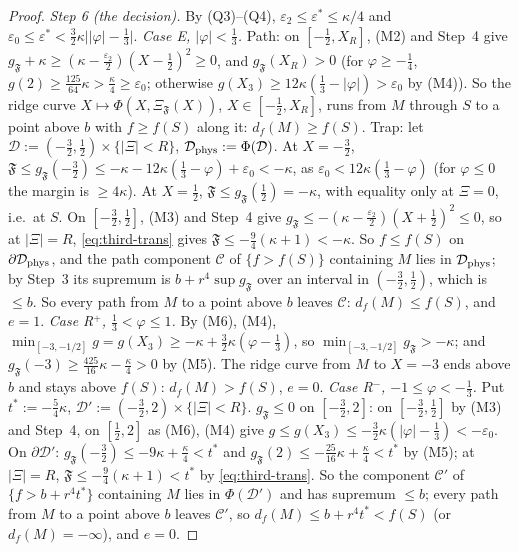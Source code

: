 \begin{proof}
\emph{Step 6 (the decision).} By (Q3)--(Q4), $\varepsilon_2\le\varepsilon^*\le\kappa/4$ and $\varepsilon_0\le\varepsilon^*<\frac32\kappa\bigl||\varphi|-\frac13\bigr|$.
\emph{Case E, $|\varphi|<\frac13$.} Path: on $[-\frac12,X_R]$, (M2) and Step~4 give $g_{\mathfrak F}+\kappa\ge(\kappa-\frac{\varepsilon_2}2)(X-\frac12)^2\ge0$, and $g_{\mathfrak F}(X_R)>0$ (for $\varphi\ge-\frac14$, $g(2)\ge\frac{125}{64}\kappa>\frac\kappa4\ge\varepsilon_0$; otherwise $g(X_3)\ge12\kappa(\frac13-|\varphi|)>\varepsilon_0$ by (M4)). So the ridge curve $X\mapsto\Phi(X,\Xi_{\mathfrak F}(X))$, $X\in[-\frac12,X_R]$, runs from $M$ through $S$ to a point above $b$ with $f\ge f(S)$ along it: $d_f(M)\ge f(S)$. Trap: let $\mathcal D:=(-\frac32,\frac12)\times\{|\Xi|<R\}$, $\mathcal D_{\rm phys}:=\Phi(\mathcal D)$. At $X=-\frac32$, $\mathfrak F\le g_{\mathfrak F}(-\frac32)\le-\kappa-12\kappa(\frac13-\varphi)+\varepsilon_0<-\kappa$, as $\varepsilon_0<12\kappa(\frac13-\varphi)$ (for $\varphi\le0$ the margin is $\ge4\kappa$). At $X=\frac12$, $\mathfrak F\le g_{\mathfrak F}(\frac12)=-\kappa$, with equality only at $\Xi=0$, i.e.\ at $S$. On $[-\frac32,\frac12]$, (M3) and Step~4 give $g_{\mathfrak F}\le-(\kappa-\frac{\varepsilon_2}2)(X+\frac12)^2\le0$, so at $|\Xi|=R$, \eqref{eq:third-trans} gives $\mathfrak F\le-\frac94(\kappa+1)<-\kappa$. So $f\le f(S)$ on $\partial\mathcal D_{\rm phys}$, and the path component $\mathcal C$ of $\{f>f(S)\}$ containing $M$ lies in $\mathcal D_{\rm phys}$; by Step~3 its supremum is $b+r^4\sup g_{\mathfrak F}$ over an interval in $(-\frac32,\frac12)$, which is $\le b$. So every path from $M$ to a point above $b$ leaves $\mathcal C$: $d_f(M)\le f(S)$, and $e=1$.
\emph{Case R$^+$, $\frac13<\varphi\le1$.} By (M6), (M4), $\min_{[-3,-1/2]}g=g(X_3)\ge-\kappa+\frac32\kappa(\varphi-\frac13)$, so $\min_{[-3,-1/2]}g_{\mathfrak F}>-\kappa$; and $g_{\mathfrak F}(-3)\ge\frac{425}{16}\kappa-\frac\kappa4>0$ by (M5). The ridge curve from $M$ to $X=-3$ ends above $b$ and stays above $f(S)$: $d_f(M)>f(S)$, $e=0$.
\emph{Case R$^-$, $-1\le\varphi<-\frac13$.} Put $t^*:=-\frac54\kappa$, $\mathcal D':=(-\frac32,2)\times\{|\Xi|<R\}$. $g_{\mathfrak F}\le0$ on $[-\frac32,2]$: on $[-\frac32,\frac12]$ by (M3) and Step~4, on $[\frac12,2]$ as (M6), (M4) give $g\le g(X_3)\le-\frac32\kappa(|\varphi|-\frac13)<-\varepsilon_0$. On $\partial\mathcal D'$: $g_{\mathfrak F}(-\frac32)\le-9\kappa+\frac\kappa4<t^*$ and $g_{\mathfrak F}(2)\le-\frac{25}{16}\kappa+\frac\kappa4<t^*$ by (M5); at $|\Xi|=R$, $\mathfrak F\le-\frac94(\kappa+1)<t^*$ by \eqref{eq:third-trans}. So the component $\mathcal C'$ of $\{f>b+r^4t^*\}$ containing $M$ lies in $\Phi(\mathcal D')$ and has supremum $\le b$; every path from $M$ to a point above $b$ leaves $\mathcal C'$, so $d_f(M)\le b+r^4t^*<f(S)$ (or $d_f(M)=-\infty$), and $e=0$.
\end{proof}

